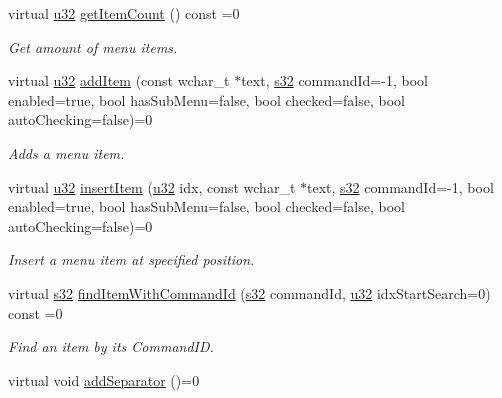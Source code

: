 \begin{DoxyCompactItemize}
virtual \hyperlink{namespaceirr_a0416a53257075833e7002efd0a18e804}{u32} \hyperlink{classirr_1_1gui_1_1IGUIContextMenu_a3e65b423c67002b64d6271072b19a829}{get\+Item\+Count} () const =0
\begin{DoxyCompactList}\small\item\em Get amount of menu items. \end{DoxyCompactList}\item 
virtual \hyperlink{namespaceirr_a0416a53257075833e7002efd0a18e804}{u32} \hyperlink{classirr_1_1gui_1_1IGUIContextMenu_afa25240cb37816c3f8941ccc0f2c14ea}{add\+Item} (const wchar\+\_\+t $\ast$text, \hyperlink{namespaceirr_ac66849b7a6ed16e30ebede579f9b47c6}{s32} command\+Id=-\/1, bool enabled=true, bool has\+Sub\+Menu=false, bool checked=false, bool auto\+Checking=false)=0
\begin{DoxyCompactList}\small\item\em Adds a menu item. \end{DoxyCompactList}\item 
virtual \hyperlink{namespaceirr_a0416a53257075833e7002efd0a18e804}{u32} \hyperlink{classirr_1_1gui_1_1IGUIContextMenu_ad4695f88c63ffc09690c5ff682c3aabc}{insert\+Item} (\hyperlink{namespaceirr_a0416a53257075833e7002efd0a18e804}{u32} idx, const wchar\+\_\+t $\ast$text, \hyperlink{namespaceirr_ac66849b7a6ed16e30ebede579f9b47c6}{s32} command\+Id=-\/1, bool enabled=true, bool has\+Sub\+Menu=false, bool checked=false, bool auto\+Checking=false)=0
\begin{DoxyCompactList}\small\item\em Insert a menu item at specified position. \end{DoxyCompactList}\item 
virtual \hyperlink{namespaceirr_ac66849b7a6ed16e30ebede579f9b47c6}{s32} \hyperlink{classirr_1_1gui_1_1IGUIContextMenu_ae7b399d9940ebe566b928517aa150383}{find\+Item\+With\+Command\+Id} (\hyperlink{namespaceirr_ac66849b7a6ed16e30ebede579f9b47c6}{s32} command\+Id, \hyperlink{namespaceirr_a0416a53257075833e7002efd0a18e804}{u32} idx\+Start\+Search=0) const =0
\begin{DoxyCompactList}\small\item\em Find an item by it\textquotesingle{}s Command\+ID. \end{DoxyCompactList}\item 
\mbox{\label{classirr_1_1gui_1_1IGUIContextMenu_a36e2edf23c88eed23d32af1d534d5bfc}} 
virtual void \hyperlink{classirr_1_1gui_1_1IGUIContextMenu_a36e2edf23c88eed23d32af1d534d5bfc}{add\+Separator} ()=0

\end{DoxyCompactItemize}
